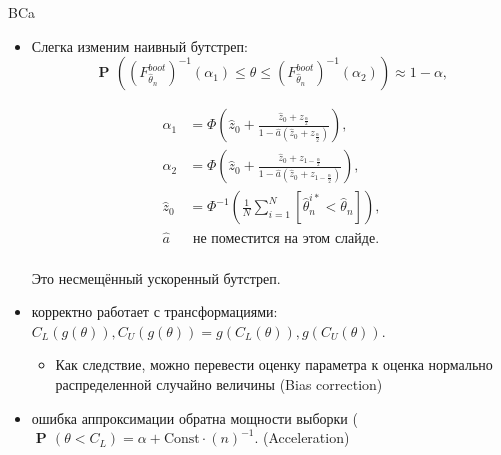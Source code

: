 \documentclass[9pt,pdf,utf8,hyperref={unicode},aspectratio=169]{beamer}
\DeclareMathOperator{\prob}{\mathbf{P}\!}
\begin{document}
\begin{frame}{BCa}
\small
		\begin{itemize}
			\item Слегка изменим наивный бутстреп:
			$$\prob\left(\left(F_{\hat{\theta}_n}^{boot}\right)^{-1}\left(\alpha_1\right) \leq \theta \leq \left(F_{\hat{\theta}_n}^{boot}\right)^{-1}\left(\alpha_2\right) \right)\approx 1-\alpha,$$	
			
			\vspace{-10pt}
			
			\begin{align*}
			\alpha_1  &= \Phi\left(\hat{z}_0 + \frac{\hat{z}_0 + z_{\frac{\alpha}{2}}}{1 - \hat{a} \left(\hat{z}_0 + z_{\frac{\alpha}{2}}\right)}\right), \\
			\alpha_2  &= \Phi\left(\hat{z}_0 + \frac{\hat{z}_0 + z_{1-\frac{\alpha}{2}}}{1 - \hat{a} \left(\hat{z}_0 + z_{1-\frac{\alpha}{2}} \right)} \right), \\	
			\hat{z}_0 &= \Phi^{-1} \left(\frac1{N} \sum_{i=1}^N \left[ \hat{\theta}_n^{i*} < \hat{\theta}_n\right]\right), \\
			\hat{a}   & \text{ не поместится на этом слайде}.\\
			\end{align*}
			
			\vspace{-5pt}
			
			Это несмещённый ускоренный бутстреп.
		\end{itemize}
	\begin{itemize}
	    \item корректно работает с трансформациями: $C_L(g(\theta)),C_U(g(\theta)) = g(C_L(\theta)), g(C_U(\theta))$.
	    	\begin{itemize}
	    	    \item Как следствие, можно перевести оценку параметра к оценка нормально распределенной случайно величины (Bias correction)
	    	\end{itemize}
	    \item ошибка аппроксимации обратна мощности выборки ($\prob({\theta}<C_L) = \alpha + \text{Const} \cdot (n)^{-1}.$ (Acceleration)
	    
	\end{itemize}
\end{frame}
\end{document}
